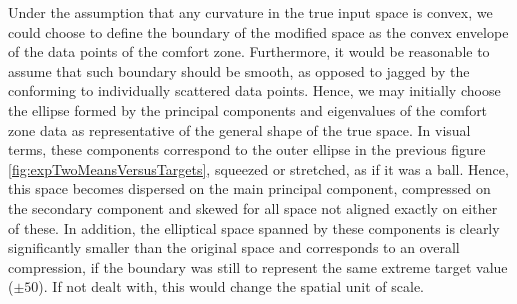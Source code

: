 
Under the assumption that any curvature in the true input space is convex, we could choose to define the boundary of the modified space as the convex envelope of the data points of the comfort zone. Furthermore, it would be reasonable to assume that such boundary should be smooth, as opposed to jagged by the conforming to individually scattered data points. Hence, we may initially choose  the ellipse formed by the principal components and eigenvalues of the comfort zone data as representative of the general shape of the true space. In visual terms, these components correspond to the outer ellipse in the previous figure \ref{fig:expTwoMeansVersusTargets}, squeezed or stretched, as if it was a ball. Hence, this space becomes dispersed on the main principal component, compressed on the secondary component and skewed for all space not aligned exactly on either of these. In addition, the elliptical space spanned by these components is clearly significantly smaller than the original space and corresponds to an overall compression, if the boundary was still to represent the same extreme target value ($\pm50$). If not dealt with, this would change the spatial unit of scale.



